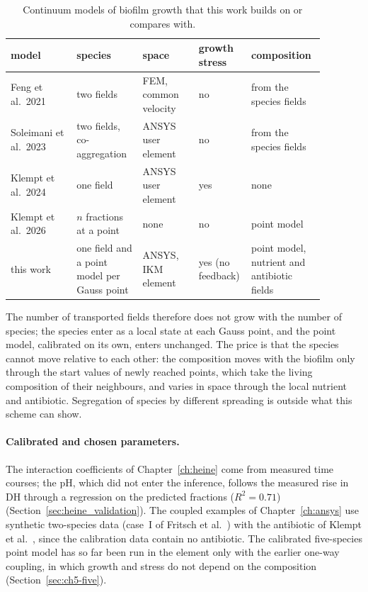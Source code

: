 \begin{table}[htbp]
  \centering
  \caption[Continuum models of biofilm growth compared]{Continuum models of
    biofilm growth that this work builds on or compares with.}
  \label{tab:concl_models}
  \small
  \begin{tabular}{@{}>{\raggedright\arraybackslash}p{0.2\linewidth}>{\raggedright\arraybackslash}p{0.2\linewidth}>{\raggedright\arraybackslash}p{0.17\linewidth}>{\raggedright\arraybackslash}p{0.1\linewidth}>{\raggedright\arraybackslash}p{0.21\linewidth}@{}}
    \toprule
    model & species & space & growth stress & composition\\
    \midrule
    Feng et al.\ 2021~\cite{Feng2021SymbioticBiofilm} & two fields & FEM, common velocity & no & from the species fields\\
    Soleimani et al.\ 2023~\cite{Soleimani2023CoAggregation} & two fields, co-aggregation & ANSYS user element & no & from the species fields\\
    Klempt et al.\ 2024~\cite{Klempt2024DiffusionDrivenGrowth} & one field & ANSYS user element & yes & none\\
    Klempt et al.\ 2026~\cite{Klempt2026ContinuumBacterialGrowth} & $n$ fractions at a point & none & no & point model\\
    this work & one field and a point model per Gauss point & ANSYS, IKM element & yes (no feedback) & point model, nutrient and antibiotic fields\\
    \bottomrule
  \end{tabular}
\end{table} The number of transported fields therefore does not grow with the
number of species; the species enter as a local state at each Gauss point, and
the point model, calibrated on its own, enters unchanged. The price is that the species cannot move relative to each other: the
composition moves with the biofilm only through the start values of newly
reached points, which take the living composition of their neighbours, and
varies in space through the local nutrient and antibiotic. Segregation of
species by different spreading is outside what this scheme can show.

\paragraph{Calibrated and chosen parameters.} The interaction coefficients of
Chapter~\ref{ch:heine} come from measured time courses; the pH, which did not enter the inference, follows
the measured rise in DH through a regression on the predicted fractions
($R^2=0.71$)
(Section~\ref{sec:heine_validation}). The coupled examples of Chapter~\ref{ch:ansys} use synthetic two-species
data (case~I of Fritsch et al.~\cite{Fritsch2025BayesianMicrofilms}) with the
antibiotic of Klempt et al.~\cite{Klempt2026ContinuumBacterialGrowth}, since the
calibration data contain no antibiotic. The calibrated
five-species point model has so far been run in the element only with the earlier one-way
coupling, in which growth and stress do not depend on the composition
(Section~\ref{sec:ch5-five}).

